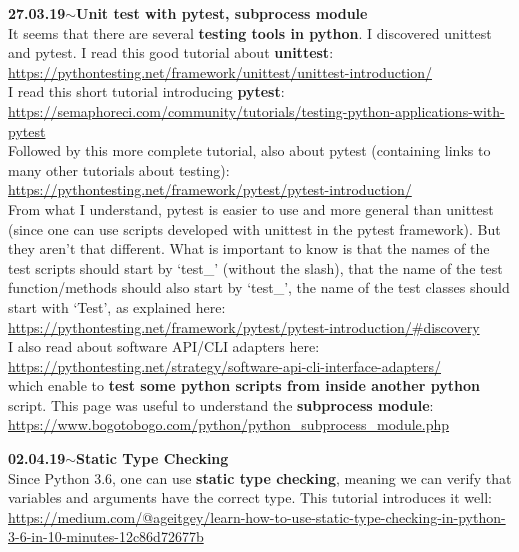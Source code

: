 \documentclass[11pt,a4paper]{article}
\newenvironment{loggentry}[2]%
{\noindent\textbf{#1}\hspace{1cm}$\mathbf{\sim}$\text{ }\textbf{#2}\\}{\vspace{0.5cm}}
\begin{document}
\begin{loggentry}{27.03.19}{Unit test with pytest, subprocess module}

It seems that there are several \textbf{testing tools in python}. I discovered unittest and pytest. I read this good tutorial about \textbf{unittest}:\\
\url{https://pythontesting.net/framework/unittest/unittest-introduction/}\\

I read this short tutorial introducing \textbf{pytest}:\\
\url{https://semaphoreci.com/community/tutorials/testing-python-applications-with-pytest}\\
Followed by this more complete tutorial, also about pytest (containing links to many other tutorials about testing):\\
\url{https://pythontesting.net/framework/pytest/pytest-introduction/}\\

From what I understand, pytest is easier to use and more general than unittest (since one can use scripts developed with unittest in the pytest framework). But they aren't that different. What is important to know is that the names of the test scripts should start by `test\_' (without the slash), that the name of the test function/methods should also start by `test\_', the name of the test classes should start with `Test', as explained here:\\
\url{https://pythontesting.net/framework/pytest/pytest-introduction/#discovery}\\

I also read about software API/CLI adapters here:\\
\url{https://pythontesting.net/strategy/software-api-cli-interface-adapters/}\\
which enable to \textbf{test some python scripts from inside another python} script. This page was useful to understand the \textbf{subprocess module}:\\
\url{https://www.bogotobogo.com/python/python_subprocess_module.php}\\

\end{loggentry}


\begin{loggentry}{02.04.19}{Static Type Checking}

Since Python 3.6, one can use \textbf{static type checking}, meaning we can verify that variables and arguments have the correct type. This tutorial introduces it well:\\
\url{https://medium.com/@ageitgey/learn-how-to-use-static-type-checking-in-python-3-6-in-10-minutes-12c86d72677b}\\

\end{loggentry}
\end{document}
